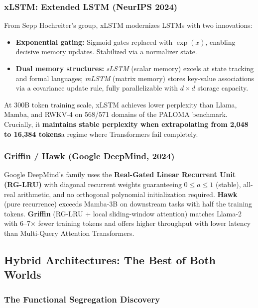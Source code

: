 \documentclass[11pt,a4paper]{article}
\begin{document}
\subsubsection{xLSTM: Extended LSTM (NeurIPS 2024)}

From Sepp Hochreiter's group, xLSTM modernizes LSTMs with two innovations:
\begin{itemize}[leftmargin=*]
    \item \textbf{Exponential gating:} Sigmoid gates replaced with $\exp(x)$, enabling decisive memory updates. Stabilized via a normalizer state.
    \item \textbf{Dual memory structures:} \textit{sLSTM} (scalar memory) excels at state tracking and formal languages; \textit{mLSTM} (matrix memory) stores key-value associations via a covariance update rule, fully parallelizable with $d \times d$ storage capacity.
\end{itemize}

At 300B token training scale, xLSTM achieves lower perplexity than Llama, Mamba, and RWKV-4 on 568/571 domains of the PALOMA benchmark. Crucially, it \textbf{maintains stable perplexity when extrapolating from 2,048 to 16,384 tokens}\textemdash a regime where Transformers fail completely.

\subsubsection{Griffin / Hawk (Google DeepMind, 2024)}

Google DeepMind's family uses the \textbf{Real-Gated Linear Recurrent Unit (RG-LRU)} with diagonal recurrent weights guaranteeing $0 \leq a \leq 1$ (stable), all-real arithmetic, and no orthogonal polynomial initialization required. \textbf{Hawk} (pure recurrence) exceeds Mamba-3B on downstream tasks with half the training tokens. \textbf{Griffin} (RG-LRU + local sliding-window attention) matches Llama-2 with 6--7$\times$ fewer training tokens and offers higher throughput with lower latency than Multi-Query Attention Transformers.

\subsection{Hybrid Architectures: The Best of Both Worlds}

\subsubsection{The Functional Segregation Discovery}
\end{document}
